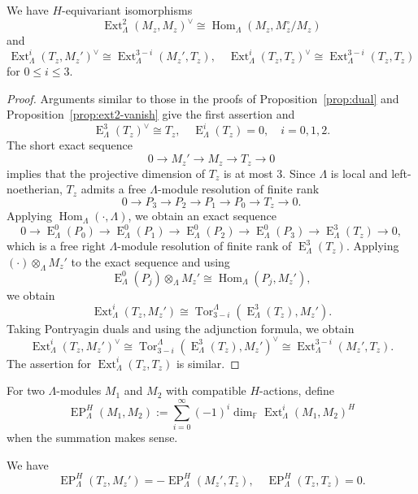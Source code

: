 \documentclass[11pt,a4paper]{article} %
\def\FF{\mathbb{F}}
\def\dim{\operatorname{dim}}
\def\E{\operatorname{E}}
\def\EP{\operatorname{EP}}
\def\Ext{\operatorname{Ext}} %
\def\Hom{\operatorname{Hom}}
\def\Tor{\operatorname{Tor}}
\begin{document}
\begin{lemma}\label{lem:Mz-dual}
    We have $H$-equivariant isomorphisms
    \[
    \Ext^2_\Lambda(M_z,M_z)^\vee
\cong\Hom_\Lambda(M_z,M_z^\circ/M_z)
    \]
and
\[
\Ext^i_\Lambda(T_z,M_z')^\vee\cong\Ext^{3-i}_\Lambda(M_z',T_z),
\quad
\Ext^i_\Lambda(T_z,T_z)^\vee\cong\Ext^{3-i}_\Lambda(T_z,T_z)
\]
for $0\leq i\leq3$.
\end{lemma}

\begin{proof}
    Arguments similar to those in the proofs of Proposition~\ref{prop:dual} and Proposition~\ref{prop:ext2-vanish} give the first assertion and
    \[
    \E^3_\Lambda(T_z)^\vee\cong T_z,\quad\E^i_\Lambda(T_z)=0,\quad i=0,1,2.
    \]
    The short exact sequence
    \[
    0\longrightarrow M_z'\longrightarrow M_z\longrightarrow T_z\longrightarrow0
    \]
    implies that the projective dimension of $T_z$ is at most 3. Since $\Lambda$ is local and left-noetherian, $T_z$ admits a free $\Lambda$-module resolution of finite rank
    \[
    0\longrightarrow P_3\longrightarrow P_2\longrightarrow P_1\longrightarrow P_0\longrightarrow T_z\longrightarrow0.
    \]
    Applying $\Hom_\Lambda(\cdot,\Lambda)$, we obtain an exact sequence
    \[
    0\longrightarrow \E^0_\Lambda(P_0)\longrightarrow \E^0_\Lambda(P_1)\longrightarrow \E^0_\Lambda(P_2)\longrightarrow \E^0_\Lambda(P_3)\longrightarrow \E^3_\Lambda(T_z)\longrightarrow0,
    \]
    which is a free right $\Lambda$-module resolution of finite rank of $\E^3_\Lambda(T_z)$. Applying $(\cdot)\otimes_{\Lambda}M_z'$ to the exact sequence and using 
    \[
    \E^0_\Lambda(P_j)\otimes_{\Lambda}M_z'\cong\Hom_\Lambda(P_j,M_z'),
    \]
    we obtain
    \[
    \Ext^i_\Lambda(T_z,M_z')\cong\Tor^\Lambda_{3-i}\left(\E^3_\Lambda(T_z),M_z'\right).
    \]
    Taking Pontryagin duals and using the adjunction formula, we obtain
    \[
     \Ext^i_\Lambda(T_z,M_z')^\vee\cong\Tor^\Lambda_{3-i}\left(\E^3_\Lambda(T_z),M_z'\right)^\vee\cong\Ext^{3-i}_\Lambda(M_z',T_z).
    \]
    The assertion for $\Ext^i_\Lambda(T_z,T_z)$ is similar.
\end{proof}

For two $\Lambda$-modules $M_1$ and $M_2$ with compatible $H$-actions, define
\[
\EP_\Lambda^H(M_1,M_2):=\sum_{i=0}^{\infty}(-1)^i\dim_\FF\Ext^i_\Lambda(M_1,M_2)^H
\]
when the summation makes sense.

\begin{corollary}\label{cor:ep}
    We have
    \[
    \EP_\Lambda^H(T_z,M_z')=-\EP_\Lambda^H(M_z',T_z),\quad\EP_\Lambda^H(T_z,T_z)=0.
    \]
\end{corollary}
\end{document}
